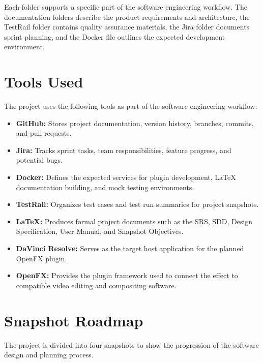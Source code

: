 \documentclass[11pt]{article}
\begin{document}
Each folder supports a specific part of the software engineering workflow. The documentation folders describe the product requirements and architecture, the TestRail folder contains quality assurance materials, the Jira folder documents sprint planning, and the Docker file outlines the expected development environment.


\section{Tools Used}

The project uses the following tools as part of the software engineering workflow:

\begin{itemize}
    \item \textbf{GitHub:} Stores project documentation, version history, branches, commits, and pull requests.
    \item \textbf{Jira:} Tracks sprint tasks, team responsibilities, feature progress, and potential bugs.
    \item \textbf{Docker:} Defines the expected services for plugin development, LaTeX documentation building, and mock testing environments.
    \item \textbf{TestRail:} Organizes test cases and test run summaries for project snapshots.
    \item \textbf{LaTeX:} Produces formal project documents such as the SRS, SDD, Design Specification, User Manual, and Snapshot Objectives.
    \item \textbf{DaVinci Resolve:} Serves as the target host application for the planned OpenFX plugin.
    \item \textbf{OpenFX:} Provides the plugin framework used to connect the effect to compatible video editing and compositing software.
\end{itemize}


\section{Snapshot Roadmap}

The project is divided into four snapshots to show the progression of the software design and planning process.
\end{document}
